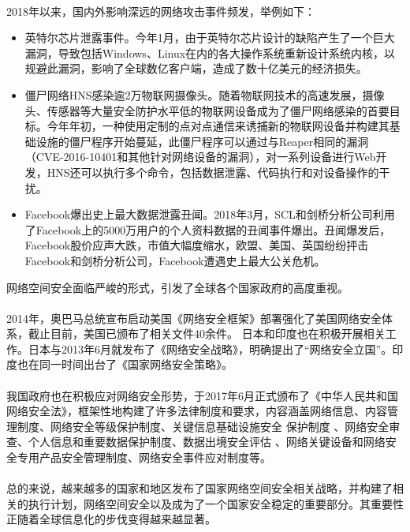 \documentclass[10pt,letterpaper]{article}
\begin{document}
\paragraph{} 2018年以来，国内外影响深远的网络攻击事件频发，举例如下：
\begin{itemize}
	\item 英特尔芯片泄露事件。今年1月，由于英特尔芯片设计的缺陷产生了一个巨大漏洞，导致包括Windows、Linux在内的各大操作系统重新设计系统内核，以规避此漏洞，影响了全球数亿客户端，造成了数十亿美元的经济损失。
	\item 僵尸网络HNS感染逾2万物联网摄像头。随着物联网技术的高速发展，摄像头、传感器等大量安全防护水平低的物联网设备成为了僵尸网络感染的首要目标。今年年初，一种使用定制的点对点通信来诱捕新的物联网设备并构建其基础设施的僵尸程序开始蔓延，此僵尸程序可以通过与Reaper相同的漏洞（CVE-2016-10401和其他针对网络设备的漏洞），对一系列设备进行Web开发，HNS还可以执行多个命令，包括数据泄露、代码执行和对设备操作的干扰。
	\item Facebook爆出史上最大数据泄露丑闻。2018年3月，SCL和剑桥分析公司利用了Facebook上的5000万用户的个人资料数据的丑闻事件爆出。丑闻爆发后，Facebook股价应声大跌，市值大幅度缩水，欧盟、美国、英国纷纷抨击Facebook和剑桥分析公司，Facebook遭遇史上最大公关危机。
\end{itemize}
网络空间安全面临严峻的形式，引发了全球各个国家政府的高度重视。


\paragraph{} 2014年，奥巴马总统宣布启动美国《网络安全框架》部署强化了美国网络安全体系，截止目前，美国已颁布了相关文件40余件。
日本和印度也在积极开展相关工作。日本与2013年6月就发布了《网络安全战略》，明确提出了“网络安全立国”。印度也在同一时间出台了《国家网络安全策略》。
\paragraph{} 我国政府也在积极应对网络安全形势，于2017年6月正式颁布了《中华人民共和国网络安全法》，框架性地构建了许多法律制度和要求，内容涵盖网络信息、内容管理制度、网络安全等级保护制度、关键信息基础设施安全 保护制度 、网络安全审查、个人信息和重要数据保护制度、数据出境安全评估 、网络关键设备和网络安全专用产品安全管理制度、网络安全事件应对制度等。
\paragraph{} 总的来说，越来越多的国家和地区发布了国家网络空间安全相关战略，并构建了相关的执行计划，网络空间安全以及成为了一个国家安全稳定的重要部分。其重要性正随着全球信息化的步伐变得越来越显著。
\end{document}

